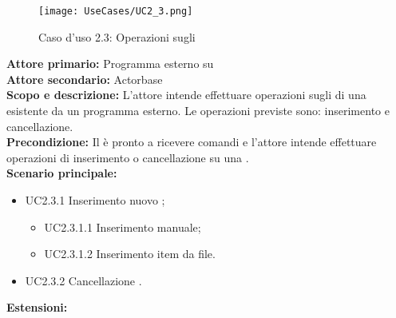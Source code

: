 \documentclass{scalatekids-article}
\begin{document}
\begin{figure}[H]
  \begin{center}
    \texttt{[image: UseCases/UC2\_3.png]}
    \caption{Caso d'uso 2.3: Operazioni sugli }
  \end{center}
\end{figure}
\textbf{Attore primario:} Programma esterno su \\
\textbf{Attore secondario:} Actorbase\\
\textbf{Scopo e descrizione:} L'attore intende effettuare operazioni sugli  di una  esistente da un programma  esterno. Le operazioni previste sono:
inserimento e cancellazione.\\
\textbf{Precondizione:} Il  è pronto a ricevere comandi e l'attore intende effettuare operazioni di inserimento o cancellazione su una .\\
\textbf{Scenario principale:}
\begin{itemize}
\item UC2.3.1 Inserimento nuovo ;
  \begin{itemize}
  \item UC2.3.1.1 Inserimento  manuale;
  \item UC2.3.1.2 Inserimento  item da file.
  \end{itemize}
\item UC2.3.2 Cancellazione .
\end{itemize}
\textbf{Estensioni:}
\end{document}
